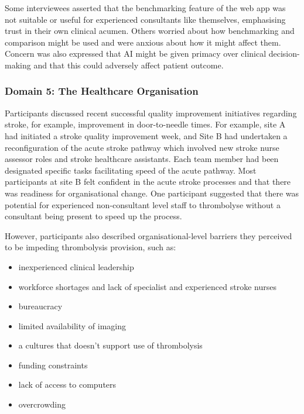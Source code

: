 Some interviewees asserted that the benchmarking feature of the web app was not suitable or useful for experienced consultants like themselves, emphasising trust in their own clinical acumen. Others worried about how benchmarking and comparison might be used and were anxious about how it might affect them. Concern was also expressed that AI might be given primacy over clinical decision-making and that this could adversely affect patient outcome.

\subsubsection{Domain 5: The Healthcare Organisation}

Participants discussed recent successful quality improvement initiatives regarding stroke, for example, improvement in door-to-needle times. For example, site A had initiated a stroke quality improvement week, and Site B had undertaken a reconfiguration of the acute stroke pathway which involved new stroke nurse assessor roles and stroke healthcare assistants. Each team member had been designated specific tasks facilitating speed of the acute pathway. Most participants at site B felt confident in the acute stroke processes and that there was readiness for organisational change. One participant suggested that there was potential for experienced non-consultant level staff to thrombolyse without a consultant being present to speed up the process.

However, participants also described organisational-level barriers they perceived to be impeding thrombolysis provision, such as:

\begin{itemize}
    \item inexperienced clinical leadership

    \item workforce shortages and lack of specialist and experienced stroke nurses

    \item bureaucracy

    \item limited availability of imaging

    \item a cultures that doesn't support use of thrombolysis

    \item funding constraints

    \item lack of access to computers

    \item overcrowding

\end{itemize}

